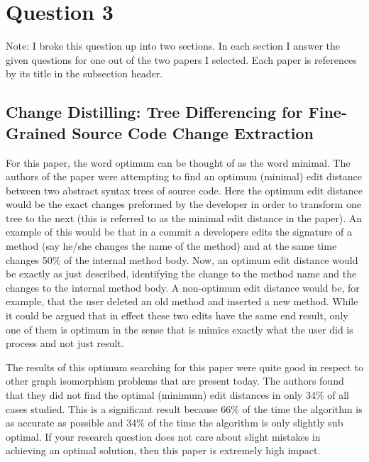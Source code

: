 \documentclass[conference]{IEEEtran}
\begin{document}
\section{Question 3}

Note: I broke this question up into two sections. In each section I answer the given questions for one out of the two papers I 
selected. Each paper is references by its title in the subsection header.

\subsection{Change Distilling: Tree Differencing for Fine-Grained Source Code Change Extraction}

For this paper, the word optimum can be thought of as the word minimal. The authors of the paper were attempting to find an optimum (minimal)
edit distance between two abstract syntax trees of source code. Here the optimum edit distance would be the exact changes preformed
by the developer in order to transform one tree to the next (this is referred to as the minimal edit distance in the paper). An example
of this would be that in a commit a developers edits the signature of a method (say he/she changes the name of the method) and at the
same time changes 50\% of the internal method body. Now, an optimum edit distance would be exactly as just described, identifying the
change to the method name and the changes to the internal method body. A non-optimum edit distance would be, for example, that the user
deleted an old method and inserted a new method. While it could be argued that in effect these two edits have the same end result, only
one of them is optimum in the sense that is mimics exactly what the user did is process and not just result.

The results of this optimum searching for this paper were quite good in respect to other graph isomorphism problems that are present today.
The authors found that they did not find the optimal (minimum) edit distances in only 34\% of all cases studied. This is a significant 
result because 66\% of the time the algorithm is as accurate as possible and 34\% of the time the algorithm is only slightly sub optimal.
If your research question does not care about slight mistakes in achieving an optimal solution, then this paper is extremely high impact.
\end{document}
